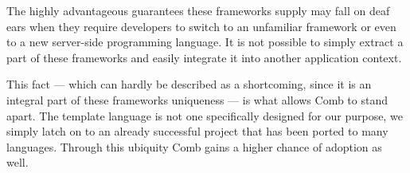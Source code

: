 \documentclass[thesis.tex]{subfiles}
\begin{document}
The highly advantageous guarantees these frameworks supply may fall on deaf ears
when they require developers to switch to an unfamiliar framework or even to
a new server-side programming language. It is not possible to simply extract a
part of these frameworks and easily integrate it into another application
context.

This fact --- which can hardly be described as a shortcoming, since it is an
integral part of these frameworks uniqueness --- is what allows Comb to stand
apart. The template language is not one specifically designed for our purpose,
we simply latch on to an already successful project that has been ported to many
languages. Through this ubiquity Comb gains a higher chance of adoption as well.
\end{document}
